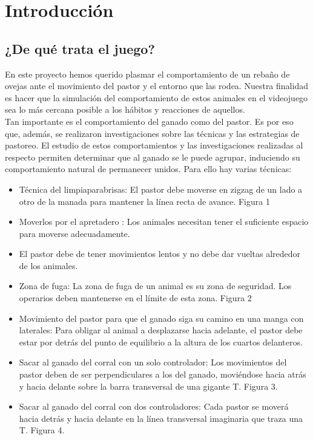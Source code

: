 \section{Introducción}
\label{sec:introduccion}

\subsection{¿De qué trata el juego?}
\label{subsubsection:intro_juego}

En este proyecto hemos querido plasmar el comportamiento de un rebaño de ovejas ante el movimiento del pastor y el entorno que las rodea. 
Nuestra finalidad es hacer que la simulación del comportamiento de estos animales en el videojuego sea lo más cercana posible a los hábitos 
y reacciones de aquellos. \\

Tan importante es el comportamiento del ganado como del pastor. Es por eso que, además, se realizaron investigaciones sobre las técnicas y 
las estrategias de pastoreo. El estudio de estos comportamientos y las investigaciones realizadas al respecto permiten determinar que al 
ganado se le puede agrupar, induciendo su comportamiento natural de permanecer unidos. Para ello hay varias técnicas:

\begin{itemize}
 \item Técnica del limpiaparabrisas: El pastor debe moverse en zigzag de un lado a otro de la manada para mantener la línea recta de avance. 
 Figura 1

 \item Moverlos por el apretadero : Los animales necesitan tener el suficiente espacio para moverse adecuadamente.

 \item El pastor debe de tener movimientos lentos y no debe dar vueltas alrededor de los animales.

 \item Zona de fuga: La zona de fuga de un animal es su zona de seguridad. Los operarios deben mantenerse en el límite de esta zona. Figura 2

 \item Movimiento del pastor para que el ganado siga su camino en una manga con laterales: Para obligar al animal a desplazarse hacia adelante, 
 el pastor debe estar por detrás del punto de equilibrio a la altura de los cuartos delanteros.

 \item Sacar al ganado del corral con un solo controlador: Los movimientos del pastor deben de ser perpendiculares a los del ganado, moviéndose 
 hacia atrás y hacia delante sobre la barra transversal de una gigante T. Figura 3.

 \item Sacar al ganado del corral con dos controladores:  Cada pastor se moverá hacia detrás y hacia delante en la línea transversal imaginaria 
 que traza una T. Figura 4.
\end{itemize}

